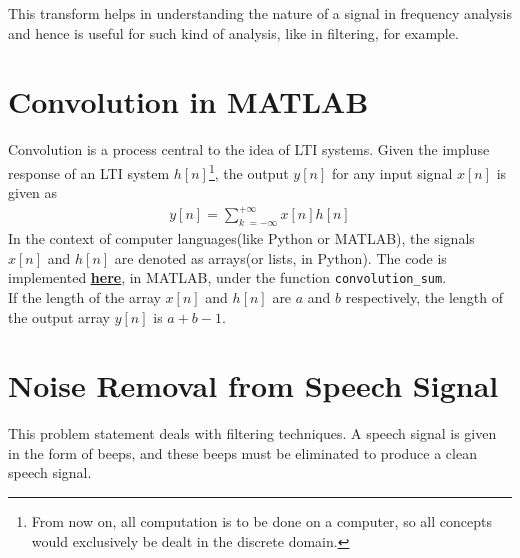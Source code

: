 \documentclass[oneside]{book}
\begin{document}
This transform helps in understanding the nature of a signal in frequency analysis and hence is useful for such kind of analysis, like in filtering, for example.

\newpage
\chapter{Convolution in MATLAB}
Convolution is a process central to the idea of LTI systems. Given the impluse response of an LTI system $h[n]$\footnote{From now on, all computation is to be done on a computer, so all concepts would exclusively be dealt in the discrete domain.}, the output $y[n]$ for any input signal $x[n]$ is given as
\begin{align}
    y[n] = \sum_{k\; = -\infty}^{+\infty}x[n]h[n]
\end{align}
In the context of computer languages(like Python or MATLAB), the signals $x[n]$ and $h[n]$ are denoted as arrays(or lists, in Python). The code is implemented \href{https://github.com/HarryNyquist/Elektronica/blob/main/Signal_Processing/Convolution/convolution_sum.m}{\underline{\textbf{here}}}, in MATLAB, under the function \verb|convolution_sum|. \\ \bigskip
If the length of the array $x[n]$ and $h[n]$ are $a$ and $b$ respectively, the length of the output array $y[n]$ is $a + b - 1$.
\chapter{Noise Removal from Speech Signal}
This problem statement deals with filtering techniques. A speech signal is given in the form of beeps, and these beeps must be eliminated to produce a clean speech signal. \\ \bigskip
\end{document}
